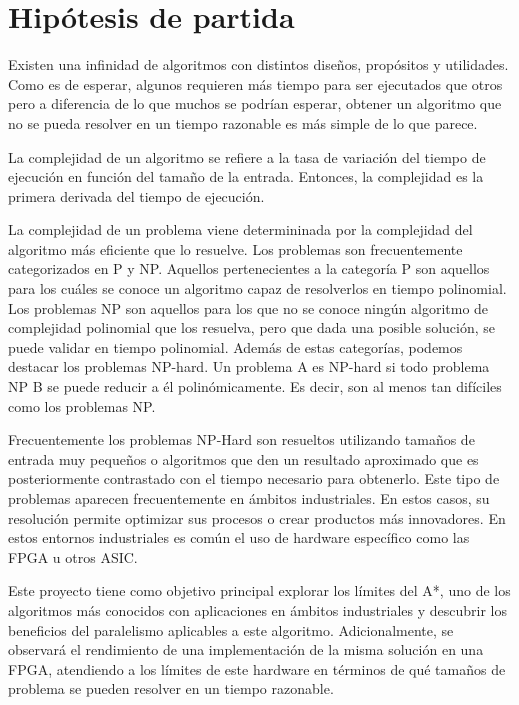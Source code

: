 
\section{Hipótesis de partida}

Existen una infinidad de algoritmos con distintos diseños, propósitos y utilidades.
Como es de esperar, algunos requieren más tiempo para ser ejecutados que otros
pero a diferencia de lo que muchos se podrían esperar,
obtener un algoritmo que no se pueda resolver en un tiempo razonable
es más simple de lo que parece.

La complejidad de un algoritmo se refiere a la tasa de variación
del tiempo de ejecución en función del tamaño de la entrada.
Entonces, la complejidad es la primera derivada del tiempo
de ejecución.

La complejidad de un problema viene determininada por la complejidad
del algoritmo más eficiente que lo resuelve.
Los problemas son frecuentemente categorizados en P y NP.
Aquellos pertenecientes a la categoría P son aquellos
para los cuáles se conoce un algoritmo capaz de resolverlos en tiempo polinomial.
Los problemas NP son aquellos para los que no se conoce ningún algoritmo
de complejidad polinomial que los resuelva, pero que dada una posible solución,
se puede validar en tiempo polinomial.
Además de estas categorías, podemos destacar los problemas NP-hard.
Un problema A es NP-hard si todo problema NP B se puede reducir a él polinómicamente.
Es decir, son al menos tan difíciles como los problemas NP.

Frecuentemente los problemas NP-Hard son resueltos utilizando
tamaños de entrada muy pequeños o algoritmos
que den un resultado aproximado que es posteriormente
contrastado con el tiempo necesario para obtenerlo.
Este tipo de problemas aparecen frecuentemente en ámbitos industriales.
En estos casos, su resolución permite optimizar sus procesos o
crear productos más innovadores.
En estos entornos industriales es común el uso de
hardware específico como las FPGA u otros ASIC.

Este proyecto tiene como objetivo principal 
explorar los límites del A*, uno de los algoritmos más
conocidos con aplicaciones en ámbitos industriales
y descubrir los beneficios del paralelismo aplicables
a este algoritmo.
Adicionalmente, se observará el rendimiento de una implementación
de la misma solución en una FPGA,
atendiendo a los límites
de este hardware en términos de qué tamaños de problema
se pueden resolver en un tiempo razonable.

